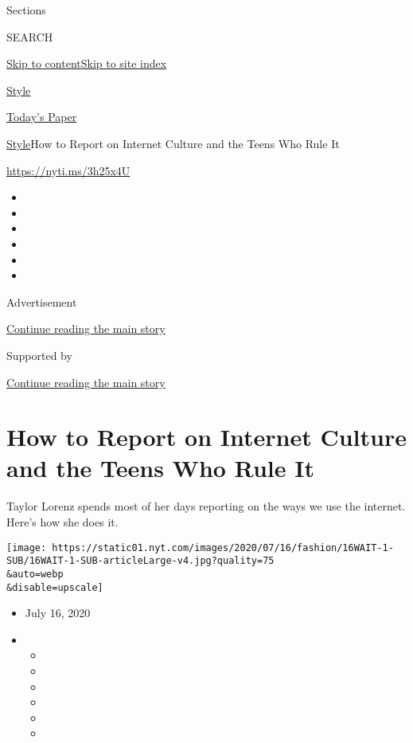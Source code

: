 Sections

SEARCH

\protect\hyperlink{site-content}{Skip to
content}\protect\hyperlink{site-index}{Skip to site index}

\href{https://www.nytimes.com/section/style}{Style}

\href{https://myaccount.nytimes.com/auth/login?response_type=cookie\&client_id=vi}{}

\href{https://www.nytimes.com/section/todayspaper}{Today's Paper}

\href{/section/style}{Style}\textbar{}How to Report on Internet Culture
and the Teens Who Rule It

\url{https://nyti.ms/3h25x4U}

\begin{itemize}
\item
\item
\item
\item
\item
\item
\end{itemize}

Advertisement

\protect\hyperlink{after-top}{Continue reading the main story}

Supported by

\protect\hyperlink{after-sponsor}{Continue reading the main story}

\hypertarget{how-to-report-on-internet-culture-and-the-teens-who-rule-it}{%
\section{How to Report on Internet Culture and the Teens Who Rule
It}\label{how-to-report-on-internet-culture-and-the-teens-who-rule-it}}

Taylor Lorenz spends most of her days reporting on the ways we use the
internet. Here's how she does it.

\texttt{[image: https://static01.nyt.com/images/2020/07/16/fashion/16WAIT-1-SUB/16WAIT-1-SUB-articleLarge-v4.jpg?quality=75\\\&auto=webp\\\&disable=upscale]}

\begin{itemize}
\item
  July 16, 2020
\item
  \begin{itemize}
  \item
  \item
  \item
  \item
  \item
  \item
  \end{itemize}
\end{itemize}

